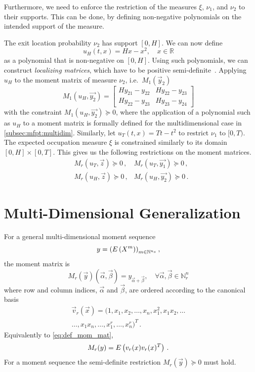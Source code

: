 Furthermore, we need to enforce the restriction of the measures $\xi$, $\nu_1$, and $\nu_2$
to their supports.
This can be done, by defining non-negative polynomials
on the intended support of the measure.
\begin{example}
The exit location probability $\nu_2$ has support $[0,H]$. We can now define
	\[
u_H(t,x) = Hx - x^2, \quad x\in \mathbb R
\]
as a polynomial that is non-negative on $[0,H]$.
Using such polynomials, we can construct \emph{localizing matrices},
which have to be positive semi-definite~\cite{lasserre2010moments}.
Applying $u_H$ to the moment matrix of measure $\nu_2$, i.e.\ $M_1(\vec{y}_2)$
	\[
M_1(u_H, \vec{y_2})=
\begin{bmatrix}
    Hy_{21} - y_{22} & Hy_{22} - y_{23} \\
    Hy_{22} - y_{23} & Hy_{23} - y_{24}
\end{bmatrix}
\]
with the constraint $M_1(u_H, \vec{y_2})\succeq 0$, where the application of
a polynomial such as $u_H$ to a moment matrix
is formally defined for the multidimensional case in \autoref{subsec:mfpt:multidim}.
Similarly, let $u_T(t, x) = Tt-t^2$ to restrict $\nu_1$ to $[0,T)$.
The expected occupation measure $\xi$ is constrained similarly to its domain
$[0,H]\times[0,T]$.
This gives us the following restrictions on the moment matrices.
\begin{equation}\label{eq:localizing_sd_constraints}
\begin{split}
	& M_r(u_T,\vec{z})\succeq 0\,, &M_r(u_T,\vec{y_1})\succeq 0\,,\\
	& M_r(u_H,\vec{z})\succeq 0\,, &M_r(u_H,\vec{y_2})\succeq 0\,.
\end{split}
\end{equation}
\end{example}

\section{Multi-Dimensional Generalization}
\label{subsec:mfpt:multidim}
For a general multi-dimensional moment sequence
\[
	y={\left({E}\left(X^{m}\right)\right)}_{m\in\mathbb{N}^{n_s}}\,,
\]
	the moment
matrix is~\cite{lasserre2010moments}
\begin{equation}\label{eq:def_mom_mat}
	M_r(\vec y)(\vec\alpha,\vec\beta)
=y_{\vec\alpha + \vec\beta},\quad\forall\vec{\alpha},
\vec{\beta}\in\mathbb{N}_r^n
\end{equation}
where row and column indices, $\vec{\alpha}$ and $\vec\beta$, are ordered according to the canonical basis
\begin{multline}\label{eq:canoncial_basis}
\vec{v}_r(\vec{x}) =
(1,x_1,x_2,\dots,x_n,x_1^2,x_1x_2,\dots \\
	\dots, x_1x_n,\dots ,x_1^r,\dots
	,x_n^r)^T\,.
\end{multline}
Equivalently to \eqref{eq:def_mom_mat},
\[
	M_r(y)={E}\left(v_r (x)v_r(x)^T\right)\,.
\]
For a moment sequence the semi-definite restriction $M_r(\vec{y})\succeq 0$ must hold.

